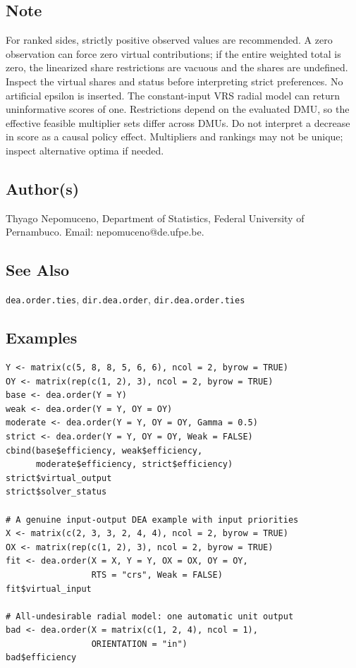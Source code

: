 \documentclass[10pt,a4paper]{article}
\newcommand{\field}[1]{\needspace{3\baselineskip}\subsection*{#1}}
\begin{document}
\field{Note}
For ranked sides, strictly positive observed values are recommended. A zero observation can force zero virtual contributions; if the entire weighted total is zero, the linearized share restrictions are vacuous and the shares are undefined. Inspect the virtual shares and status before interpreting strict preferences. No artificial epsilon is inserted. The constant-input VRS radial model can return uninformative scores of one. Restrictions depend on the evaluated DMU, so the effective feasible multiplier sets differ across DMUs. Do not interpret a decrease in score as a causal policy effect. Multipliers and rankings may not be unique; inspect alternative optima if needed.
\field{Author(s)}
Thyago Nepomuceno, Department of Statistics, Federal University of Pernambuco. Email: nepomuceno@de.ufpe.be.
\field{See Also}
\texttt{dea.order.ties}, \texttt{dir.dea.order}, \texttt{dir.dea.order.ties}
\field{Examples}
\begin{verbatim}
Y <- matrix(c(5, 8, 8, 5, 6, 6), ncol = 2, byrow = TRUE)
OY <- matrix(rep(c(1, 2), 3), ncol = 2, byrow = TRUE)
base <- dea.order(Y = Y)
weak <- dea.order(Y = Y, OY = OY)
moderate <- dea.order(Y = Y, OY = OY, Gamma = 0.5)
strict <- dea.order(Y = Y, OY = OY, Weak = FALSE)
cbind(base$efficiency, weak$efficiency,
      moderate$efficiency, strict$efficiency)
strict$virtual_output
strict$solver_status

# A genuine input-output DEA example with input priorities
X <- matrix(c(2, 3, 3, 2, 4, 4), ncol = 2, byrow = TRUE)
OX <- matrix(rep(c(1, 2), 3), ncol = 2, byrow = TRUE)
fit <- dea.order(X = X, Y = Y, OX = OX, OY = OY,
                 RTS = "crs", Weak = FALSE)
fit$virtual_input

# All-undesirable radial model: one automatic unit output
bad <- dea.order(X = matrix(c(1, 2, 4), ncol = 1),
                 ORIENTATION = "in")
bad$efficiency
\end{verbatim}
\end{document}
